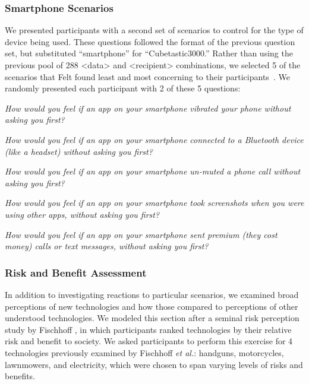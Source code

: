 \subsubsection{Smartphone Scenarios}
\label{sec:smartphones}
We presented participants with a second set of scenarios to control for the type of device being used. These questions followed the format of the previous question set, but substituted ``smartphone'' for ``Cubetastic3000.'' Rather than using the previous pool of 288 <data> and <recipient> combinations, we selected 5 of the scenarios that Felt \etal found least and most concerning to their participants~\cite{Felt}. We randomly presented each participant with 2 of these 5 questions: \\[-.8cm]

\begin{packed_enum}
\item \textit{How would you feel if an app on your smartphone vibrated your phone without asking you first?}
\item \textit{How would you feel if an app on your smartphone connected to a Bluetooth device (like a headset) without asking you first?}
\item \textit{How would you feel if an app on your smartphone un-muted a phone call without asking you first?}
\item \textit{How would you feel if an app on your smartphone took screenshots when you were using other apps, without asking you first?}
\item \textit{How would you feel if an app on your smartphone sent premium (they cost money) calls or text messages, without asking you first?} 
\end{packed_enum}

\subsubsection{Risk and Benefit Assessment}
In addition to investigating reactions to particular scenarios, we examined broad perceptions of new technologies and how those compared to perceptions of other understood technologies. We modeled this section after a seminal risk perception study by Fischhoff \etal\cite{Fischhoff}, in which participants ranked technologies by their relative risk and benefit to society. We asked participants to perform this exercise for 4 technologies previously examined by Fischhoff {\it et al.}: handguns, motorcycles, lawnmowers, and electricity, which were chosen to span varying levels of risks and benefits.

